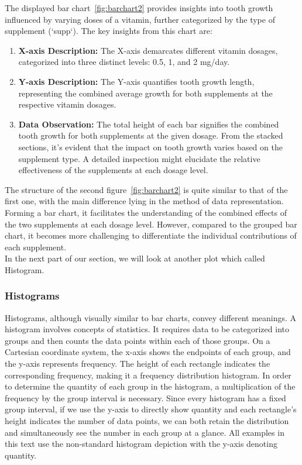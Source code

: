 \documentclass{article}\usepackage[]{graphicx}\usepackage[]{xcolor}
\begin{document}
\noindent
The displayed bar chart~\ref{fig:barchart2} provides insights into tooth growth influenced by varying doses of a vitamin, further categorized by the type of supplement (`supp`). The key insights from this chart are:

\begin{enumerate}
    \item \textbf{X-axis Description:} The X-axis demarcates different vitamin dosages, categorized into three distinct levels: 0.5, 1, and 2 mg/day.
    \item \textbf{Y-axis Description:} The Y-axis quantifies tooth growth length, representing the combined average growth for both supplements at the respective vitamin dosages.
    \item \textbf{Data Observation:} The total height of each bar signifies the combined tooth growth for both supplements at the given dosage. From the stacked sections, it's evident that the impact on tooth growth varies based on the supplement type. A detailed inspection might elucidate the relative effectiveness of the supplements at each dosage level.
\end{enumerate}

\noindent
The structure of the second figure~\ref{fig:barchart2} is quite similar to that of the first one, with the main difference lying in the method of data representation. Forming a bar chart, it facilitates the understanding of the combined effects of the two supplements at each dosage level. However, compared to the grouped bar chart, it becomes more challenging to differentiate the individual contributions of each supplement.\\

\noindent
In the next part of our section, we will look at another plot which called Histogram.

\subsubsection{Histograms}

Histograms, although visually similar to bar charts, convey different meanings. A histogram involves concepts of statistics. It requires data to be categorized into groups and then counts the data points within each of those groups. On a Cartesian coordinate system, the x-axis shows the endpoints of each group, and the y-axis represents frequency. The height of each rectangle indicates the corresponding frequency, making it a frequency distribution histogram. In order to determine the quantity of each group in the histogram, a multiplication of the frequency by the group interval is necessary. Since every histogram has a fixed group interval, if we use the y-axis to directly show quantity and each rectangle's height indicates the number of data points, we can both retain the distribution and simultaneously see the number in each group at a glance. All examples in this text use the non-standard histogram depiction with the y-axis denoting quantity.\\
\end{document}
